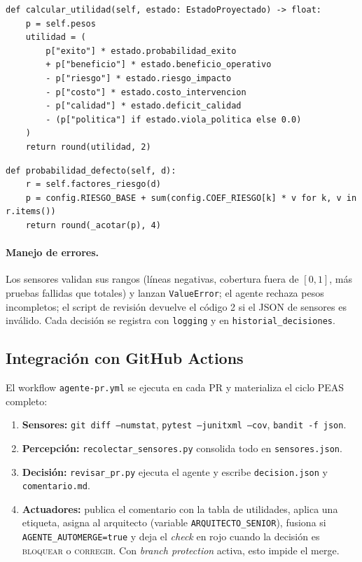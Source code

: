 \documentclass[11pt,a4paper]{article}
\newcommand{\Pdef}{P_{\text{def}}}
\begin{document}
\begin{lstlisting}[caption={Función de utilidad (\texttt{base.py}).}]
def calcular_utilidad(self, estado: EstadoProyectado) -> float:
    p = self.pesos
    utilidad = (
        p["exito"] * estado.probabilidad_exito
        + p["beneficio"] * estado.beneficio_operativo
        - p["riesgo"] * estado.riesgo_impacto
        - p["costo"] * estado.costo_intervencion
        - p["calidad"] * estado.deficit_calidad
        - (p["politica"] if estado.viola_politica else 0.0)
    )
    return round(utilidad, 2)
\end{lstlisting}

\begin{lstlisting}[caption={Modelo de riesgo $\Pdef(s)$ (\texttt{agente.py}).}]
def probabilidad_defecto(self, d):
    r = self.factores_riesgo(d)
    p = config.RIESGO_BASE + sum(config.COEF_RIESGO[k] * v for k, v in r.items())
    return round(_acotar(p), 4)
\end{lstlisting}

\paragraph{Manejo de errores.} Los sensores validan sus rangos (líneas negativas, cobertura fuera de
$[0,1]$, más pruebas fallidas que totales) y lanzan \texttt{ValueError}; el agente rechaza pesos
incompletos; el script de revisión devuelve el código 2 si el JSON de sensores es inválido. Cada
decisión se registra con \texttt{logging} y en \texttt{historial\_decisiones}.

\subsection{Integración con GitHub Actions}

El workflow \texttt{agente-pr.yml} se ejecuta en cada PR y materializa el ciclo PEAS completo:

\begin{enumerate}[leftmargin=*]
\item \textbf{Sensores:} \texttt{git diff --numstat}, \texttt{pytest --junitxml --cov}, \texttt{bandit -f json}.
\item \textbf{Percepción:} \texttt{recolectar\_sensores.py} consolida todo en \texttt{sensores.json}.
\item \textbf{Decisión:} \texttt{revisar\_pr.py} ejecuta el agente y escribe \texttt{decision.json} y \texttt{comentario.md}.
\item \textbf{Actuadores:} publica el comentario con la tabla de utilidades, aplica una etiqueta,
      asigna al arquitecto (variable \texttt{ARQUITECTO\_SENIOR}), fusiona si
      \texttt{AGENTE\_AUTOMERGE=true} y deja el \textit{check} en rojo cuando la decisión es
      \textsc{bloquear} o \textsc{corregir}. Con \textit{branch protection} activa, esto impide el merge.
\end{enumerate}
\end{document}
